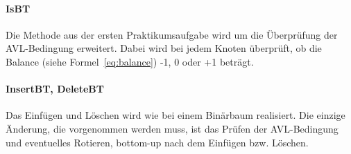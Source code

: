 \paragraph{IsBT}
Die Methode aus der ersten Praktikumsaufgabe wird um die Überprüfung der
AVL-Bedingung erweitert.
Dabei wird bei jedem Knoten überprüft, ob die Balance (siehe Formel~\ref{eq:balance}) -1, 0 oder
+1 beträgt.

\paragraph{InsertBT, DeleteBT}
Das Einfügen und Löschen wird wie bei einem Binärbaum realisiert.
Die einzige Änderung, die vorgenommen werden muss, ist das Prüfen der
AVL-Bedingung und eventuelles Rotieren, bottom-up nach dem Einfügen bzw. Löschen.
